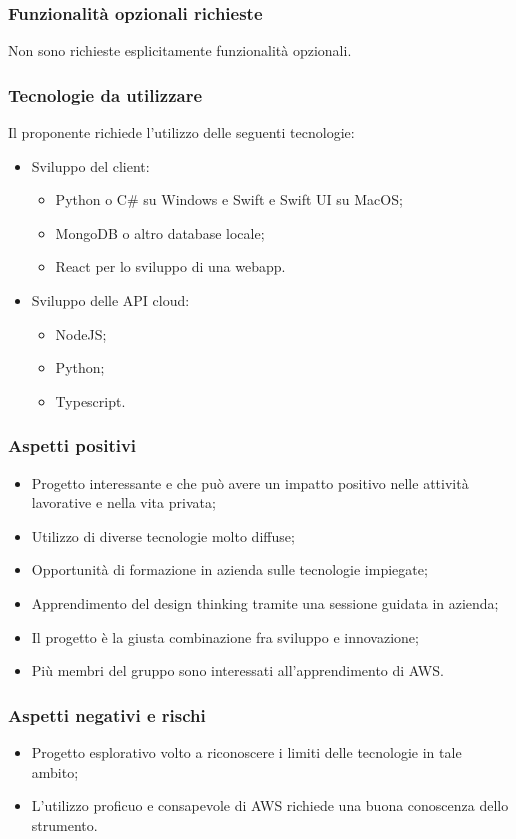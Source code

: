 \documentclass[10pt]{article}
\begin{document}
\subsubsection{Funzionalità opzionali richieste}
Non sono richieste esplicitamente funzionalità opzionali.
\subsubsection{Tecnologie da utilizzare}
Il proponente richiede l’utilizzo delle seguenti tecnologie:
\begin{itemize}
    \item Sviluppo del client: 
    \begin{itemize}
        \item Python o C\# su Windows e Swift e Swift UI su MacOS;
        \item MongoDB o altro database locale;
        \item React per lo sviluppo di una webapp.
    \end{itemize}
    \item Sviluppo delle API cloud: 
    \begin{itemize}
        \item NodeJS;
        \item Python;
        \item Typescript.
    \end{itemize}
\end{itemize}
\subsubsection{Aspetti positivi}
\begin{itemize}
    \item Progetto interessante e che può avere un impatto positivo nelle attività lavorative e nella vita privata;
    \item Utilizzo di diverse tecnologie molto diffuse;
    \item Opportunità di formazione in azienda sulle tecnologie impiegate;
    \item Apprendimento del design thinking tramite una sessione guidata in azienda;
    \item Il progetto è la giusta combinazione fra sviluppo e innovazione;
    \item Più membri del gruppo sono interessati all’apprendimento di AWS.
\end{itemize}
\subsubsection{Aspetti negativi e rischi}
\begin{itemize}
    \item Progetto esplorativo volto a riconoscere i limiti delle tecnologie in tale ambito;
    \item L’utilizzo proficuo e consapevole di AWS richiede una buona conoscenza dello strumento.
\end{itemize}
\end{document}
